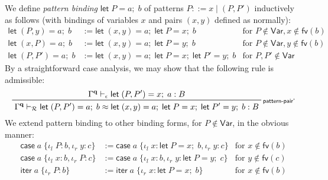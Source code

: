 \documentclass[acmsmall,screen,review]{acmart}
\newcommand{\mc}[1]{\ensuremath{\mathcal{#1}}}
\newcommand{\mb}[1]{\ensuremath{\mathbf{#1}}}
\newcommand{\ms}[1]{\ensuremath{\mathsf{#1}}}
\newcommand{\lto}{:}
\newcommand{\linl}[1]{\iota_l\;{#1}}
\newcommand{\linr}[1]{\iota_r\;{#1}}
\newcommand{\letexpr}[3]{\ensuremath{\ms{let}\;#1 = #2;\;#3}}
\newcommand{\caseexpr}[5]{\ms{case}\;#1\;\{\linl{#2} \lto #3, \linr{#4} \lto #5\}}
\newcommand{\liter}[3]{\ms{iter}\;#1\;\{ \linr{#2} \lto #3 \}}
\newcommand{\rle}[1]{{\scriptsize\textsf{#1}}}
\newcommand{\hasty}[4]{#1 \vdash_{#2} #3: {#4}}
\newcommand{\teqv}{\approx}
\newcommand{\tmeq}[5]{#1 \vdash_{#2} #3 \teqv #4 : {#5}}
\begin{document}
We define \emph{pattern binding} $\letexpr{P}{a}{b}$ of patterns $P ::= x \mid (P, P')$ inductively
as follows (with bindings of variables $x$ and pairs $(x, y)$ defined as normally):
\begin{align*}
  \letexpr{(P, y)}{a}{b} &:= \letexpr{(x, y)}{a}{\letexpr{P}{x}{b}} 
    & \text{for } P \notin \ms{Var}, x \notin \ms{fv}(b) \\
  \letexpr{(x, P)}{a}{b} &:= \letexpr{(x, y)}{a}{\letexpr{P}{y}{b}} 
    & \text{for } P \notin \ms{Var}, y \notin \ms{fv}(b) \\
  \letexpr{(P, P')}{a}{b} &:= \letexpr{(x, y)}{a}{\letexpr{P}{x}{\letexpr{P'}{y}{b}}} 
    & \text{for } P, P' \notin \ms{Var}
\end{align*}
By a straightforward case analysis, we may show that the following rule is admissible:
\begin{equation*}
  \prftree[r]{\rle{pattern-pair'}}
    {\hasty{\Gamma^{\mb{q}}}{\epsilon}{\letexpr{(P, P')}{x}{a}}{B}}
    {\tmeq{\Gamma^{\mb{q}}}
      {\mc{R}}{\letexpr{(P, P')}{a}{b}}
      {\letexpr{(x, y)}{a}{\letexpr{P}{x}{\letexpr{P'}{y}{b}}}}{B}}
\end{equation*}
We extend pattern binding to other binding forms, for $P \notin \ms{Var}$, in the obvious manner:
\begin{align*}
  \caseexpr{a}{P}{b}{y}{c} &:= \caseexpr{a}{x}{\letexpr{P}{x}{b}}{y}{c} 
  & \text{for } x \notin \ms{fv}(b) \\
  \caseexpr{a}{x}{b}{P}{c} &:= \caseexpr{a}{x}{b}{y}{\letexpr{P}{y}{c}} 
  & \text{for } y \notin \ms{fv}(c) \\
  \liter{a}{P}{b} &:= \liter{a}{x}{\letexpr{P}{x}{b}}
  & \text{for } x \notin \ms{fv}(b)
\end{align*}
\end{document}
